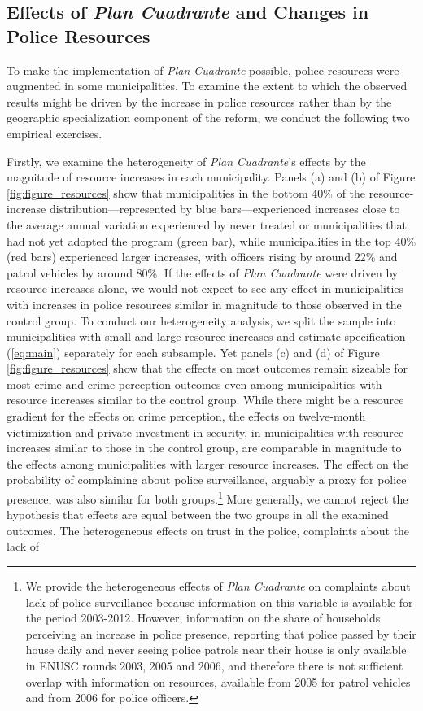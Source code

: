 
\clearpage

\subsection{Effects of \emph{Plan Cuadrante} and Changes in Police Resources}
\label{resources_plan_cuadrante} 

To make the implementation of \emph{Plan Cuadrante} possible, police resources were augmented in some municipalities. To examine the extent to which the observed results might be driven by the increase in police resources rather than by the geographic specialization component of the reform, we conduct the following two empirical exercises.

Firstly, we examine the heterogeneity of \emph{Plan Cuadrante}'s effects by the magnitude of resource increases in each municipality. Panels (a) and (b) of Figure \ref{fig:figure_resources} show that municipalities in the bottom 40\% of the resource-increase distribution---represented by blue bars---experienced increases close to the average annual variation experienced by never treated or municipalities that had not yet adopted the program (green bar), while municipalities in the top 40\% (red bars) experienced larger increases, with officers rising by around 22\% and patrol vehicles by around 80\%. If the effects of \emph{Plan Cuadrante} were driven by resource increases alone, we would not expect to see any effect in municipalities with increases in police resources similar in magnitude to those observed in the control group. To conduct our heterogeneity analysis, we split the sample into municipalities with small and large resource increases and estimate specification (\ref{eq:main}) separately for each subsample. Yet panels (c) and (d) of Figure \ref{fig:figure_resources} show that the effects on most outcomes remain sizeable for most crime and crime perception outcomes even among municipalities with resource increases similar to the control group. While there might be a resource gradient for the effects on crime perception, the effects on twelve-month victimization and private investment in security, in municipalities with resource increases similar to those in the control group, are comparable in magnitude to the effects among municipalities with larger resource increases. The effect on the probability of complaining about police surveillance, arguably a proxy for police presence, was also similar for both groups.\footnote{We provide the heterogeneous effects of \emph{Plan Cuadrante} on complaints about lack of police surveillance because information on this variable is available for the period 2003-2012. However, information on the share of households perceiving an increase in police presence, reporting that police passed by their house daily and never seeing police patrols near their house is only available in ENUSC rounds 2003, 2005 and 2006, and therefore there is not sufficient overlap with information on resources, available from 2005 for patrol vehicles and from 2006 for police officers.} More generally, we cannot reject the hypothesis that effects are equal between the two groups in all the examined outcomes. The heterogeneous effects on trust in the police, complaints about the lack of 